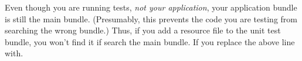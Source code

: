 
Even though you are running tests, \emph{not your application}, your application bundle is still the main bundle. (Presumably, this prevents the code you are testing from searching the wrong bundle.) Thus, if you add a resource file to the unit test bundle, you won't find it if search the main bundle. If you replace the above line with.

